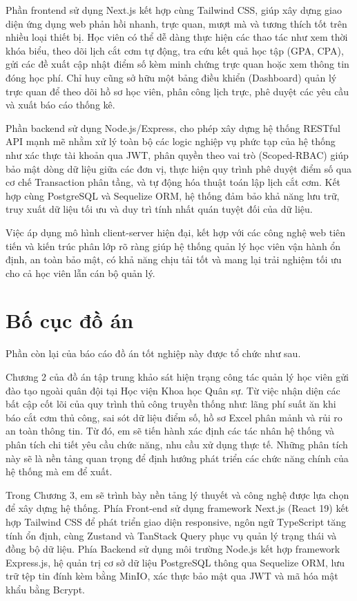 \documentclass[../DoAn.tex]{subfiles}
\begin{document}
Phần frontend sử dụng Next.js kết hợp cùng Tailwind CSS, giúp xây dựng giao diện ứng dụng web phản hồi nhanh, trực quan, mượt mà và tương thích tốt trên nhiều loại thiết bị. Học viên có thể dễ dàng thực hiện các thao tác như xem thời khóa biểu, theo dõi lịch cắt cơm tự động, tra cứu kết quả học tập (GPA, CPA), gửi các đề xuất cập nhật điểm số kèm minh chứng trực quan hoặc xem thông tin đóng học phí. Chỉ huy cũng sở hữu một bảng điều khiển (Dashboard) quản lý trực quan để theo dõi hồ sơ học viên, phân công lịch trực, phê duyệt các yêu cầu và xuất báo cáo thống kê.

Phần backend sử dụng Node.js/Express, cho phép xây dựng hệ thống RESTful API mạnh mẽ nhằm xử lý toàn bộ các logic nghiệp vụ phức tạp của hệ thống như xác thực tài khoản qua JWT, phân quyền theo vai trò (Scoped-RBAC) giúp bảo mật dòng dữ liệu giữa các đơn vị, thực hiện quy trình phê duyệt điểm số qua cơ chế Transaction phân tầng, và tự động hóa thuật toán lập lịch cắt cơm. Kết hợp cùng PostgreSQL và Sequelize ORM, hệ thống đảm bảo khả năng lưu trữ, truy xuất dữ liệu tối ưu và duy trì tính nhất quán tuyệt đối của dữ liệu.

Việc áp dụng mô hình client-server hiện đại, kết hợp với các công nghệ web tiên tiến và kiến trúc phân lớp rõ ràng giúp hệ thống quản lý học viên vận hành ổn định, an toàn bảo mật, có khả năng chịu tải tốt và mang lại trải nghiệm tối ưu cho cả học viên lẫn cán bộ quản lý.

\section{Bố cục đồ án}
\label{section:1.4}
Phần còn lại của báo cáo đồ án tốt nghiệp này được tổ chức như sau.

Chương 2 của đồ án tập trung khảo sát hiện trạng công tác quản lý học viên gửi đào tạo ngoài quân đội tại Học viện Khoa học Quân sự. Từ việc nhận diện các bất cập cốt lõi của quy trình thủ công truyền thống như: lãng phí suất ăn khi báo cắt cơm thủ công, sai sót dữ liệu điểm số, hồ sơ Excel phân mảnh và rủi ro an toàn thông tin. Từ đó, em sẽ  tiến hành xác định các tác nhân hệ thống và phân tích chi tiết yêu cầu chức năng, nhu cầu xử dụng thực tế. Những phân tích này sẽ là nền tảng quan trọng để định hướng phát triển các chức năng chính của hệ thống mà em để xuất.

Trong Chương 3, em sẽ  trình bày nền tảng  lý thuyết và công nghệ được lựa chọn để xây dựng hệ thống. Phía Front-end sử dụng framework Next.js (React 19) kết hợp Tailwind CSS để phát triển giao diện responsive, ngôn ngữ TypeScript tăng tính ổn định, cùng Zustand và TanStack Query phục vụ quản lý trạng thái và đồng bộ dữ liệu. Phía Backend sử dụng môi trường Node.js kết hợp framework Express.js, hệ quản trị cơ sở dữ liệu PostgreSQL thông qua Sequelize ORM, lưu trữ tệp tin đính kèm bằng MinIO, xác thực bảo mật qua JWT và mã hóa mật khẩu bằng Bcrypt.
\end{document}
